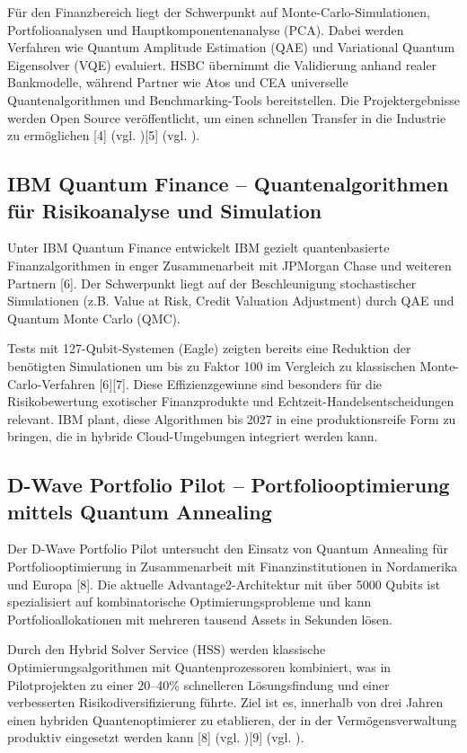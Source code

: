 Für den Finanzbereich liegt der Schwerpunkt auf Monte-Carlo-Simulationen, Portfolioanalysen und Hauptkomponentenanalyse (PCA). Dabei werden Verfahren wie Quantum Amplitude Estimation (QAE) und Variational Quantum Eigensolver (VQE) evaluiert. HSBC übernimmt die Validierung anhand realer Bankmodelle, während Partner wie Atos und CEA universelle Quantenalgorithmen und Benchmarking-Tools bereitstellen. Die Projektergebnisse werden Open Source veröffentlicht, um einen schnellen Transfer in die Industrie zu ermöglichen [4] (vgl. \cite{brandhofer_benchmarking_20220})[5] (vgl. \cite{brandhofer_benchmarking_20220}).

\subsection{IBM Quantum Finance – Quantenalgorithmen für Risikoanalyse und Simulation}

Unter IBM Quantum Finance entwickelt IBM gezielt quantenbasierte Finanzalgorithmen in enger Zusammenarbeit mit JPMorgan Chase und weiteren Partnern [6]. Der Schwerpunkt liegt auf der Beschleunigung stochastischer Simulationen (z.B. Value at Risk, Credit Valuation Adjustment) durch QAE und Quantum Monte Carlo (QMC).

Tests mit 127-Qubit-Systemen (Eagle) zeigten bereits eine Reduktion der benötigten Simulationen um bis zu Faktor 100 im Vergleich zu klassischen Monte-Carlo-Verfahren [6][7]. Diese Effizienzgewinne sind besonders für die Risikobewertung exotischer Finanzprodukte und Echtzeit-Handelsentscheidungen relevant. IBM plant, diese Algorithmen bis 2027 in eine produktionsreife Form zu bringen, die in hybride Cloud-Umgebungen integriert werden kann.

\subsection{D-Wave Portfolio Pilot – Portfoliooptimierung mittels Quantum Annealing}

Der D-Wave Portfolio Pilot untersucht den Einsatz von Quantum Annealing für Portfoliooptimierung in Zusammenarbeit mit Finanzinstitutionen in Nordamerika und Europa [8]. Die aktuelle Advantage2-Architektur mit über 5000 Qubits ist spezialisiert auf kombinatorische Optimierungsprobleme und kann Portfolioallokationen mit mehreren tausend Assets in Sekunden lösen.

Durch den Hybrid Solver Service (HSS) werden klassische Optimierungsalgorithmen mit Quantenprozessoren kombiniert, was in Pilotprojekten zu einer 20–40\% schnelleren Lösungsfindung und einer verbesserten Risikodiversifizierung führte. Ziel ist es, innerhalb von drei Jahren einen hybriden Quantenoptimierer zu etablieren, der in der Vermögensverwaltung produktiv eingesetzt werden kann [8] (vgl. \cite{brandhofer_benchmarking_20220})[9] (vgl. \cite{brandhofer_benchmarking_20220}).


